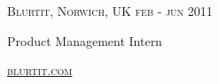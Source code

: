 {
  \textsc{\small{Blurtit, Norwich, UK
    \hfill
      {\raggedleft
        feb - jun 2011
      } \\
    }
  }
  {\raggedright\large {
    Product Management Intern
  } \\}

  \textsc{\small\href{http://www.blurtit.com}{blurtit.com}}
}
